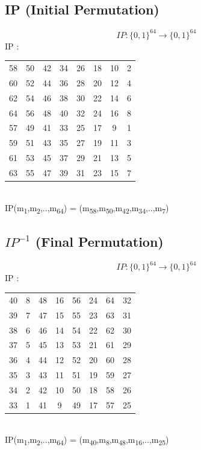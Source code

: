 \documentclass[11pt]{article}
\begin{document}
	\subsection{IP (Initial Permutation)}
	$$IP : \{0,1\}^{64} \rightarrow \{0,1\}^{64}$$
	IP :
	\begin{tabular}{ c c c c c c c c }
		58 & 50 & 42 & 34 & 26 & 18 & 10 & 2\\ 
		60 & 52 & 44 & 36 & 28 & 20 & 12 & 4\\  
		62 & 54 & 46 & 38 & 30 & 22 & 14 & 6\\
		64 & 56 & 48 & 40 & 32 & 24 & 16 & 8\\
		57 & 49 & 41 & 33 & 25 & 17 & 9 & 1\\
		59 & 51 & 43 & 35 & 27 & 19 & 11 & 3\\
		61 & 53 & 45 & 37 & 29 & 21 & 13 & 5\\
		63 & 55 & 47 & 39 & 31 & 23 & 15 & 7
	\end{tabular}\\
	IP(m\textsubscript{1},m\textsubscript{2},..,m\textsubscript{64}) = (m\textsubscript{58},m\textsubscript{50},m\textsubscript{42},m\textsubscript{34},..,m\textsubscript{7})\\
	\subsection{$IP^{-1}$ (Final Permutation)}
	$$IP : \{0,1\}^{64} \rightarrow \{0,1\}^{64}$$
	IP :
	\begin{tabular}{ c c c c c c c c }
		40 & 8 & 48 & 16 & 56 & 24 & 64 & 32\\ 
		39 & 7 & 47 & 15 & 55 & 23 & 63 & 31\\  
		38 & 6 & 46 & 14 & 54 & 22 & 62 & 30\\
		37 & 5 & 45 & 13 & 53 & 21 & 61 & 29\\
		36 & 4 & 44 & 12 & 52 & 20 & 60 & 28\\
		35 & 3 & 43 & 11 & 51 & 19 & 59 & 27\\
		34 & 2 & 42 & 10 & 50 & 18 & 58 & 26\\
		33 & 1 & 41 & 9 & 49 & 17 & 57 & 25
	\end{tabular}\\
	IP(m\textsubscript{1},m\textsubscript{2},..,m\textsubscript{64}) = (m\textsubscript{40},m\textsubscript{8},m\textsubscript{48},m\textsubscript{16},..,m\textsubscript{25})\\
\end{document}

